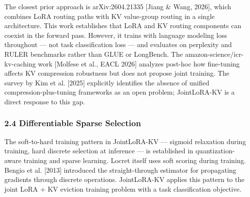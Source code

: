 The closest prior approach is arXiv:2604.21335 [Jiang \& Wang, 2026], which combines LoRA routing paths with KV value-group routing in a single architecture. This work establishes that LoRA and KV routing components can coexist in the forward pass. However, it trains with language modeling loss throughout — not task classification loss — and evaluates on perplexity and RULER benchmarks rather than GLUE or LongBench. The amazon-science/icr-kv-caching work [Molfese et al., EACL 2026] analyzes post-hoc how fine-tuning affects KV compression robustness but does not propose joint training. The survey by Kim et al. [2025] explicitly identifies the absence of unified compression-plus-tuning frameworks as an open problem; JointLoRA-KV is a direct response to this gap.

\subsubsection{2.4 Differentiable Sparse Selection}

The soft-to-hard training pattern in JointLoRA-KV — sigmoid relaxation during training, hard discrete selection at inference — is established in quantization-aware training and sparse learning. Locret itself uses soft scoring during training. Bengio et al. [2013] introduced the straight-through estimator for propagating gradients through discrete operations. JointLoRA-KV applies this pattern to the joint LoRA + KV eviction training problem with a task classification objective.

